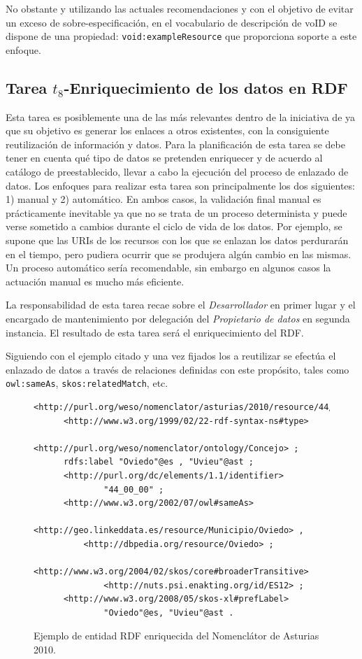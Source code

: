 No obstante y utilizando las actuales recomendaciones y con el objetivo de evitar un exceso de sobre-especificación, en el vocabulario 
de descripción de \datasets voID se dispone de una propiedad: \texttt{void:exampleResource} que proporciona soporte a este enfoque.

\subsection{Tarea $t_8$-Enriquecimiento de los datos en RDF}
Esta tarea es posiblemente una de las más relevantes dentro de la iniciativa de \linkeddata ya que su objetivo
es generar los enlaces a otros \datasets existentes, con la consiguiente reutilización de información
y datos. Para la planificación de esta tarea se debe tener en cuenta qué tipo de datos se pretenden 
enriquecer y de acuerdo al catálogo de \datasets preestablecido, llevar a cabo la ejecución
del proceso de enlazado de datos. Los enfoques para realizar esta tarea son principalmente los dos siguientes:
1) manual y 2) automático. En ambos casos, la validación final manual es prácticamente inevitable ya que no se trata de un proceso determinista y puede verse sometido a cambios durante el ciclo de vida
de los datos. Por ejemplo, se supone que las \gls{URI}s de los recursos con los que se enlazan los datos 
perdurarán en el tiempo, pero pudiera ocurrir que se produjera algún cambio en las mismas. Un proceso
automático sería recomendable, sin embargo en algunos casos la actuación manual es mucho más eficiente.

La responsabilidad de esta tarea recae sobre el \textit{Desarrollador} en primer lugar y el encargado de mantenimiento por delegación del 
\textit{Propietario de datos} en segunda instancia. El resultado de esta tarea será el enriquecimiento
del \dataset \gls{RDF}.

Siguiendo con el ejemplo citado y una vez fijados los \datasets a reutilizar se efectúa 
el enlazado de datos a través de relaciones definidas con este propósito, tales como \texttt{owl:sameAs}, \texttt{skos:relatedMatch}, etc.

\begin{figure}[!htp]
\begin{lstlisting} 
<http://purl.org/weso/nomenclator/asturias/2010/resource/44/00/00>
      <http://www.w3.org/1999/02/22-rdf-syntax-ns#type>
              <http://purl.org/weso/nomenclator/ontology/Concejo> ;
      rdfs:label "Oviedo"@es , "Uvieu"@ast ;
      <http://purl.org/dc/elements/1.1/identifier>
              "44_00_00" ;
      <http://www.w3.org/2002/07/owl#sameAs>
              <http://geo.linkeddata.es/resource/Municipio/Oviedo> , 
	      <http://dbpedia.org/resource/Oviedo> ;
      <http://www.w3.org/2004/02/skos/core#broaderTransitive>
              <http://nuts.psi.enakting.org/id/ES12> ;
      <http://www.w3.org/2008/05/skos-xl#prefLabel>
              "Oviedo"@es, "Uvieu"@ast .
\end{lstlisting}
	\caption{Ejemplo de entidad RDF enriquecida del Nomenclátor de Asturias 2010.}
	\label{fig:modelo-nomen-template}
\end{figure}


